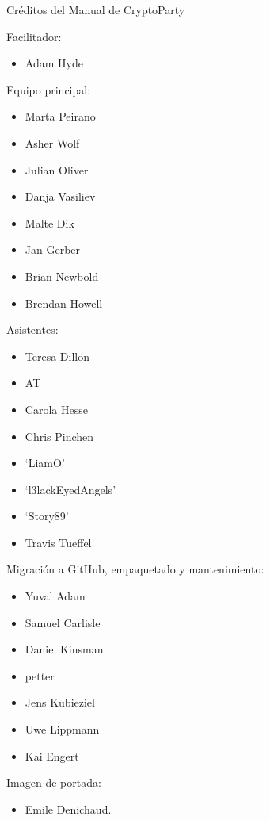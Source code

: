 \documentclass[10pt,a5paper,twoside,,]{book}
\providecommand{\tightlist}{%
  \setlength{\itemsep}{0pt}\setlength{\parskip}{0pt}}
\begin{document}
Créditos del Manual de CryptoParty

Facilitador:

\begin{itemize}
\tightlist
\item
  Adam Hyde
\end{itemize}

Equipo principal:

\begin{itemize}
\tightlist
\item
  Marta Peirano
\item
  Asher Wolf
\item
  Julian Oliver
\item
  Danja Vasiliev
\item
  Malte Dik
\item
  Jan Gerber
\item
  Brian Newbold
\item
  Brendan Howell
\end{itemize}

Asistentes:

\begin{itemize}
\tightlist
\item
  Teresa Dillon
\item
  AT
\item
  Carola Hesse
\item
  Chris Pinchen
\item
  `LiamO'
\item
  `l3lackEyedAngels'
\item
  `Story89'
\item
  Travis Tueffel
\end{itemize}

Migración a GitHub, empaquetado y mantenimiento:

\begin{itemize}
\tightlist
\item
  Yuval Adam
\item
  Samuel Carlisle
\item
  Daniel Kinsman
\item
  petter
\item
  Jens Kubieziel
\item
  Uwe Lippmann
\item
  Kai Engert
\end{itemize}

Imagen de portada:

\begin{itemize}
\tightlist
\item
  Emile Denichaud.
\end{itemize}
\end{document}
